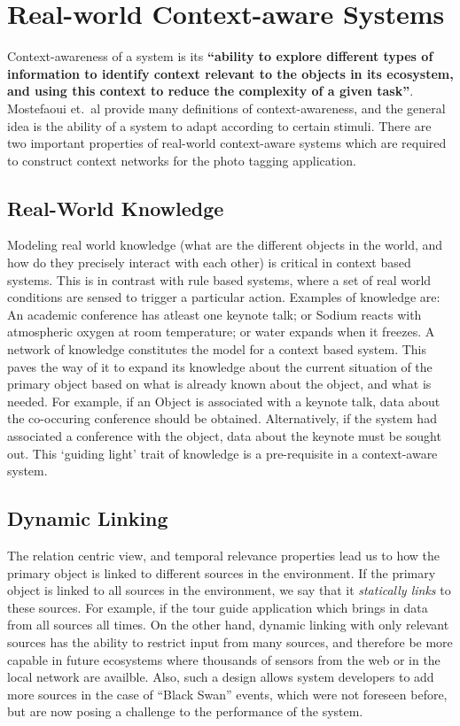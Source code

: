 \section{Real-world Context-aware Systems}

Context-awareness of a system is its \textbf{``ability to explore different types of information to identify context relevant to the objects in its ecosystem, and using this context to reduce the complexity of a given task''}. Mostefaoui et.\ al provide many definitions of context-awareness, and the general idea is the ability of a system to adapt according to certain stimuli. There are two important properties of real-world context-aware systems which are required to construct context networks for the photo tagging application.

\subsection{Real-World Knowledge}
Modeling real world knowledge (what are the different objects in the world, and how do they precisely interact with each other) is critical in context based systems. This is in contrast with rule based systems, where a set of real world conditions are sensed to trigger a particular action. Examples of knowledge are: An academic conference has atleast one keynote talk; or Sodium reacts with atmospheric oxygen at room temperature; or water expands when it freezes. A network of knowledge constitutes the model for a context based system. This paves the way of it to expand its knowledge about the current situation of the primary object based on what is already known about the object, and what is needed. For example, if an Object is associated with a keynote talk, data about the co-occuring conference should be obtained. Alternatively, if the system had associated a conference with the object, data about the keynote must be sought out. This `guiding light' trait of knowledge is a pre-requisite in a context-aware system.

\subsection{Dynamic Linking}
The relation centric view, and temporal relevance properties lead us to how the primary object is linked to different sources in the environment. If the primary object is linked to all sources in the environment, we say that it \textit{statically links} to these sources. For example, if the tour guide application which brings in data from all sources all times. On the other hand, dynamic linking with only relevant sources has the ability to restrict input from many sources, and therefore be more capable in future ecosystems where thousands of sensors from the web or in the local network are availble. Also, such a design allows system developers to add more sources in the case of ``Black Swan'' events, which were not foreseen before, but are now posing a challenge to the performance of the system.

